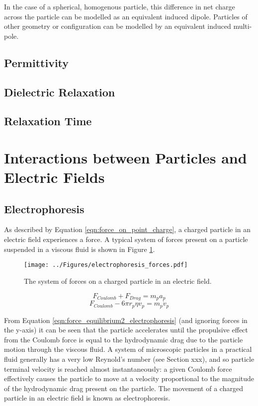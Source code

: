 In the case of a spherical, homogenous particle, this difference in net charge across the particle can be modelled as an equivalent induced dipole. Particles of other geometry or configuration can be modelled by an equivalent induced multi-pole. 

\subsection{Permittivity}
\subsection{Dielectric Relaxation}
\subsection{Relaxation Time}
\section{Interactions between Particles and Electric Fields}
\subsection{Electrophoresis}
As described by Equation \ref{eqn:force_on_point_charge}, a charged particle in an electric field experiences a force. A typical system of forces present on a particle suspended in a viscous fluid is shown in Figure \ref{fig:electrophoresis_forces}.

\begin{figure}
 \centering
 \texttt{[image: ../Figures/electrophoresis\_forces.pdf]}
\label{fig:electrophoresis_forces}
\caption{The system of forces on a charged particle in an electric field.}
\end{figure}

\begin{equation}
 F_{Coulomb} + F_{Drag} = m_{p} a_{p}
\label{eqn:force_equilibrium1_electrophoresis}
\end{equation}
\begin{equation}
 F_{Coulomb} - 6 \pi r_{p} \eta v_{p} = m_{p} \dot{v}_{p}
\label{eqn:force_equilibrium2_electrophoresis}
\end{equation}

From Equation \ref{eqn:force_equilibrium2_electrophoresis} (and ignoring forces in the y-axis) it can be seen that the particle accelerates until the propulsive effect from the Coulomb force is equal to the hydrodynamic drag due to the particle motion through the viscous fluid. A system of microscopic particles in a practical fluid generally has a very low Reynold's number (see Section xxx), and so particle terminal velocity is reached almost instantaneously: a given Coulomb force effectively causes the particle to move at a velocity proportional to the magnitude of the hydrodynamic drag present on the particle. The movement of a charged particle in an electric field is known as electrophoresis.

